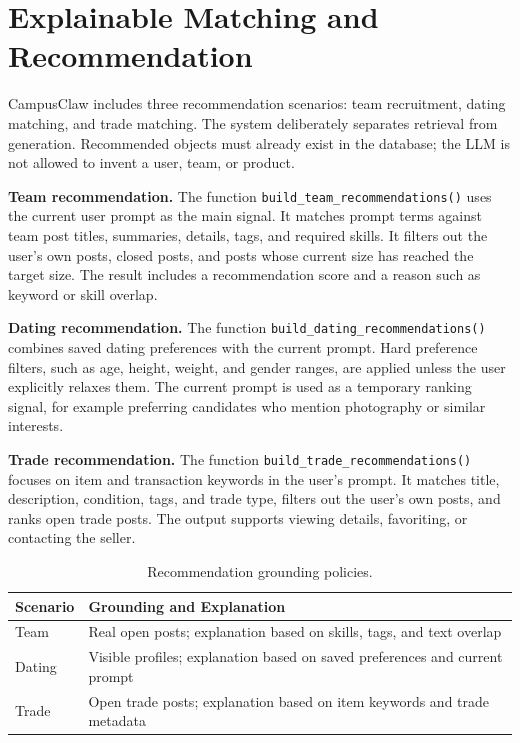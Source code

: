 \documentclass[sigconf]{acmart}
\begin{document}
\section{Explainable Matching and Recommendation}
CampusClaw includes three recommendation scenarios: team recruitment, dating matching, and trade matching. The system deliberately separates retrieval from generation. Recommended objects must already exist in the database; the LLM is not allowed to invent a user, team, or product.

\textbf{Team recommendation.} The function \texttt{build\_team\_recommendations()} uses the current user prompt as the main signal. It matches prompt terms against team post titles, summaries, details, tags, and required skills. It filters out the user's own posts, closed posts, and posts whose current size has reached the target size. The result includes a recommendation score and a reason such as keyword or skill overlap.

\textbf{Dating recommendation.} The function \texttt{build\_dating\_recommendations()} combines saved dating preferences with the current prompt. Hard preference filters, such as age, height, weight, and gender ranges, are applied unless the user explicitly relaxes them. The current prompt is used as a temporary ranking signal, for example preferring candidates who mention photography or similar interests.

\textbf{Trade recommendation.} The function \texttt{build\_trade\_recommendations()} focuses on item and transaction keywords in the user's prompt. It matches title, description, condition, tags, and trade type, filters out the user's own posts, and ranks open trade posts. The output supports viewing details, favoriting, or contacting the seller.

\begin{table}[t]
\centering
\caption{Recommendation grounding policies.}
\label{tab:recommendations}
\begin{tabularx}{\linewidth}{lX}
\toprule
\textbf{Scenario} & \textbf{Grounding and Explanation}\\
\midrule
Team & Real open posts; explanation based on skills, tags, and text overlap\\
Dating & Visible profiles; explanation based on saved preferences and current prompt\\
Trade & Open trade posts; explanation based on item keywords and trade metadata\\
\bottomrule
\end{tabularx}
\end{table}
\end{document}
